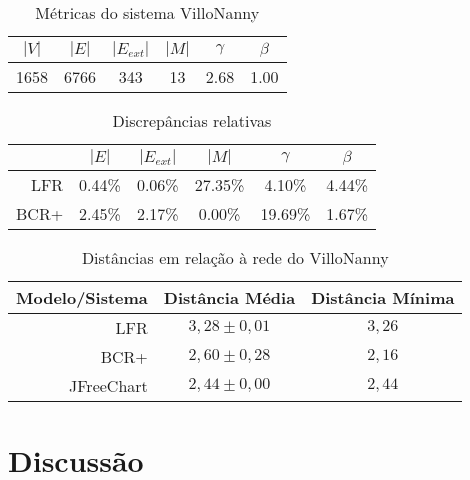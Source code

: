 \documentclass{acm_proc_article-sp}
\begin{document}
\begin{table}
\caption{Métricas do sistema VilloNanny}
\begin{center}
\begin{tabular}{c c c c c c}
\hline
\hline
$|V|$ & $|E|$ & $|E_{ext}|$ & $|M|$ & $\gamma$ & $\beta$ \\
\hline
1658  & 6766  & 343         &  13   & 2.68     & 1.00 \\
\hline
\end{tabular}
\end{center}
\end{table}

\begin{table}
\caption{Discrepâncias relativas}
\begin{center}
\begin{tabular}{r | c c c c c}
\hline
\hline
    & $|E|$ & $|E_{ext}|$ & $|M|$ & $\gamma$ & $\beta$ \\
\hline
LFR & 0.44\% & 0.06\%   & 27.35\% & 4.10\%   & 4.44\% \\
BCR+ & 2.45\% & 2.17\%   & 0.00\%  & 19.69\%  & 1.67\% \\
\hline
\end{tabular}
\end{center}
\end{table}

\begin{table}
\caption{Distâncias em relação à rede do VilloNanny}
\begin{center}
\begin{tabular}{r | c c}
\hline
\hline
Modelo/Sistema & Distância Média              & Distância Mínima \\
\hline
LFR        & $3,28 \pm 0,01$ & $3,26$ \\
BCR+        & $2,60 \pm 0,28$ & $2,16$ \\
JFreeChart & $2,44 \pm 0,00$ & $2,44$ \\
\hline
\end{tabular}
\end{center}
\end{table}


\section{Discussão} \label{sec:discussao} %
\end{document}
